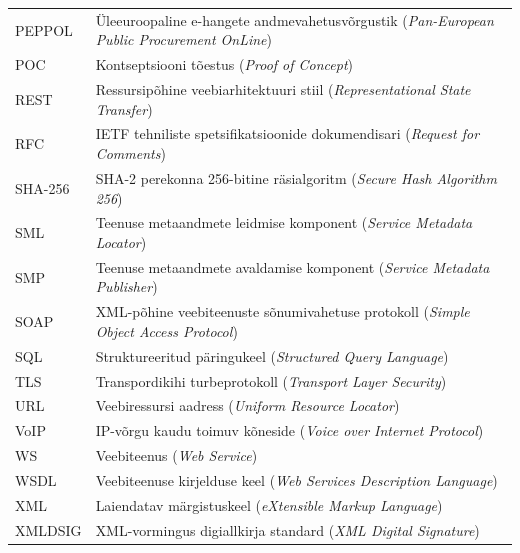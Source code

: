 \begin{longtable}{p{3cm}p{10cm}}
PEPPOL&Üleeuroopaline e-hangete andmevahetusvõrgustik (\textit{Pan-European Public Procurement OnLine})\\
POC&Kontseptsiooni tõestus (\textit{Proof of Concept})\\
REST&Ressursipõhine veebiarhitektuuri stiil (\textit{Representational State Transfer})\\
RFC&IETF tehniliste spetsifikatsioonide dokumendisari (\textit{Request for Comments})\\
SHA-256&SHA-2 perekonna 256-bitine räsialgoritm (\textit{Secure Hash Algorithm 256})\\
SML&Teenuse metaandmete leidmise komponent (\textit{Service Metadata Locator})\\
SMP&Teenuse metaandmete avaldamise komponent (\textit{Service Metadata Publisher})\\
SOAP&XML-põhine veebiteenuste sõnumivahetuse protokoll (\textit{Simple Object Access Protocol})\\
SQL&Struktureeritud päringukeel (\textit{Structured Query Language})\\
TLS&Transpordikihi turbeprotokoll (\textit{Transport Layer Security})\\
URL&Veebiressursi aadress (\textit{Uniform Resource Locator})\\
VoIP&IP-võrgu kaudu toimuv kõneside (\textit{Voice over Internet Protocol})\\
WS&Veebiteenus (\textit{Web Service})\\
WSDL&Veebiteenuse kirjelduse keel (\textit{Web Services Description Language})\\
XML&Laiendatav märgistuskeel (\textit{eXtensible Markup Language})\\
XMLDSIG&XML-vormingus digiallkirja standard (\textit{XML Digital Signature})\\
\end{longtable}
\addtocounter{table}{-1}
